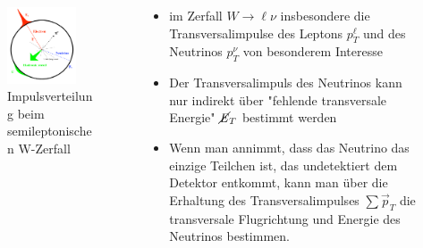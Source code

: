 \documentclass[aspectratio=1610, 9pt]{beamer}
\begin{document}
\begin{frame}
  \begin{columns}
    \begin{column}{0.4\textwidth}
      \begin{figure}
        \includegraphics[width=0.8\textwidth]{images/w-recoil.png}
        \caption{Impulsverteilung beim semileptonischen W-Zerfall \cite{recoil}}
      \end{figure}
    \end{column}
    \begin{column}{0.4\textwidth}
      \begin{itemize}
        \item im Zerfall $W \rightarrow \ell \nu$ insbesondere die Transversalimpulse des Leptons $p^\ell_T$ und des Neutrinos $p^\nu_T$ von besonderem Interesse
        \item Der Transversalimpuls des Neutrinos kann nur indirekt über "fehlende transversale Energie"  $\cancel{\it{E}}_{T}$ bestimmt werden
        \item Wenn man annimmt, dass das Neutrino das einzige Teilchen ist, das undetektiert dem Detektor entkommt, kann man über die Erhaltung des Transversalimpulses $\sum \vec{p}_T$ die transversale Flugrichtung und Energie des Neutrinos bestimmen.
      \end{itemize}
    \end{column}
  \end{columns}
\end{frame}
\end{document}
